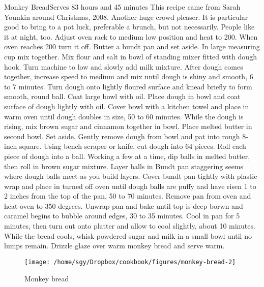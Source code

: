 \begin{recipe}{Monkey Bread}{Serves 8}{3 hours and 45 minutes}
\freeform This recipe came from Sarah Younkin around Christmas, 2008.  Another huge crowd pleaser.  It is particular good to bring to a pot luck, preferable a brunch, but not necessarily.  People like it at night, too.
\newstep
Adjust oven rack to medium low position and heat to 200\0.  When oven reaches 200\0 turn it off.
Butter a bundt pan and set aside.
In large measuring cup mix together.
Mix flour and salt in bowl of standing mixer fitted with dough hook.
\newstep
Turn machine to low and slowly add milk mixture.  After dough comes together, increase speed to medium and mix until dough is shiny and smooth, 6 to 7 minutes. Turn dough onto lightly floured surface and knead briefly to form smooth, round ball. Coat large bowl with oil. Place dough in bowl and coat surface of dough lightly with oil. Cover bowl with a kitchen towel and place in warm oven until dough doubles in size, 50 to 60 minutes.
While the dough is rising, mix brown sugar and cinnamon together in bowl. Place melted butter in second bowl. Set aside.
\newstep
Gently remove dough from bowl and pat into rough 8-inch square. Using bench scraper or knife, cut dough into 64 pieces.
\newstep
Roll each piece of dough into a ball. Working a few at a time, dip balls in melted butter, then roll in brown sugar mixture. Layer balls in Bundt pan staggering seems where dough balls meet as you build layers.
\newstep
Cover bundt pan tightly with plastic wrap and place in turned off oven until dough balls are puffy and have risen 1 to 2 inches from the top of the pan, 50 to 70 minutes.
\newstep
Remove pan from oven and heat oven to 350 degrees. Unwrap pan and bake until top is deep borwn and caramel begins to bubble around edges, 30 to 35 minutes. Cool in pan for 5 minutes, then turn out onto platter and allow to cool slightly, about 10 minutes.
While the bread cools, whisk powdered sugar and milk in a small bowl until no lumps remain. Drizzle glaze over warm monkey bread and serve warm. 
\end{recipe}
\begin{figure}
\begin{center}
\texttt{[image: /home/sgy/Dropbox/cookbook/figures/monkey-bread-2]}
\end{center}
\caption*{Monkey bread}
\end{figure}
\clearpage
